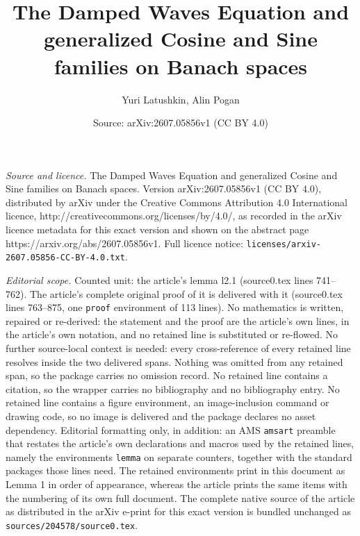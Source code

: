 \documentclass[10pt,a4paper]{amsart}
\title{The Damped Waves Equation and generalized Cosine and Sine families on Banach spaces}
\author{Yuri Latushkin, Alin Pogan}
\date{Source: arXiv:2607.05856v1 (CC BY 4.0)}
\begin{document}
\maketitle

\noindent\emph{Source and licence.} The Damped Waves Equation and generalized Cosine and Sine families on Banach spaces. Version arXiv:2607.05856v1 (CC BY 4.0), distributed by arXiv under the Creative Commons Attribution 4.0 International licence, http://creativecommons.org/licenses/by/4.0/, as recorded in the arXiv licence metadata for this exact version and shown on the abstract page https://arxiv.org/abs/2607.05856v1. Full licence notice: \texttt{licenses/arxiv-2607.05856-CC-BY-4.0.txt}.\par\smallskip

\noindent\textit{Editorial scope.} Counted unit: the article's lemma l2.1 (source0.tex lines 741--762). The article's complete original proof of it is delivered with it (source0.tex lines 763--875, one \texttt{proof} environment of 113 lines). No mathematics is written, repaired or re-derived: the statement and the proof are the article's own lines, in the article's own notation, and no retained line is substituted or re-flowed.  No further source-local context is needed: every cross-reference of every retained line resolves inside the two delivered spans.  Nothing was omitted from any retained span, so the package carries no omission record.  No retained line contains a citation, so the wrapper carries no bibliography and no bibliography entry.  No retained line contains a figure environment, an image-inclusion command or drawing code, so no image is delivered and the package declares no asset dependency.  Editorial formatting only, in addition: an AMS \texttt{amsart} preamble that restates the article's own declarations and macros used by the retained lines, namely the environments \texttt{lemma} on separate counters, together with the standard packages those lines need.  The retained environments print in this document as Lemma 1 in order of appearance, whereas the article prints the same items with the numbering of its own full document.  The complete native source of the article as distributed in the arXiv e-print for this exact version is bundled unchanged as \texttt{sources/204578/source0.tex}.
\end{document}
